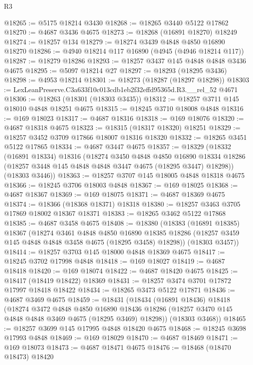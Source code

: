\begin{lexlean}{R3}
\begin{coremodule}
@18265 := @5175 @18214 @3430
@18268 := @18265 @3440 @5122 @17862
@18270 := @4687 @3436 @4675
@18273 := @18268 (@16891 @18270) @18249
@18274 := @18257 @134
@18279 := @18274 @3439 @4848 @4850 @16890 @18270
@18286 := @4940 @18214 @117 @16890 (@4945 (@4946 @18214 @117))
@18287 := @18279 @18286
@18293 := @18257 @3437 @145 @4848 @4848 @3436 @4675
@18295 := @5097 @18214 @27
@18297 := @18293 (@18295 @3436)
@18298 := @4953 @18214
@18301 := @18273 (@18287 (@18297 @18298))
@18303 := LexLeanPreserve.C3a633f10c013cdb1eb2f32effd95365d.R3.__rel_52 @4671
@18306 := @18263 (@18301 (@18303 @3435))
@18312 := @18257 @3711 @145 @18010 @4848 @18251 @4675
@18315 := @18245 @3710 @18008 @4848
@18316 := @169 @18023
@18317 := @4687 @18316
@18318 := @169 @18076
@18320 := @4687 @18318 @4675
@18323 := @18315 (@18317 @18320) @18251
@18329 := @18257 @3452 @3709 @17866 @18007 @18316 @18320
@18332 := @18265 @3451 @5122 @17865
@18334 := @4687 @3447 @4675
@18357 := @18329
    (@18332
      (@16891 @18334)
      @18316
      (@18274
        @3450
        @4848
        @4850
        @16890
        @18334
        @18286
        (@18257 @3448 @145 @4848 @4848 @3447 @4675 (@18295 @3447) @18298))
      (@18303 @3446))
@18363 := @18257 @3707 @145 @18005 @4848 @18318 @4675
@18366 := @18245 @3706 @18003 @4848
@18367 := @169 @18025
@18368 := @4687 @18367
@18369 := @169 @18075
@18371 := @4687 @18369 @4675
@18374 := @18366 (@18368 @18371) @18318
@18380 := @18257 @3463 @3705 @17869 @18002 @18367 @18371
@18383 := @18265 @3462 @5122 @17868
@18385 := @4687 @3458 @4675
@18408 := @18380
    (@18383
      (@16891 @18385)
      @18367
      (@18274
        @3461
        @4848
        @4850
        @16890
        @18385
        @18286
        (@18257 @3459 @145 @4848 @4848 @3458 @4675 (@18295 @3458) @18298))
      (@18303 @3457))
@18414 := @18257 @3703 @145 @18000 @4848 @18369 @4675
@18417 := @18245 @3702 @17998 @4848
@18418 := @169 @18027
@18419 := @4687 @18418
@18420 := @169 @18074
@18422 := @4687 @18420 @4675
@18425 := @18417 (@18419 @18422) @18369
@18431 := @18257 @3474 @3701 @17872 @17997 @18418 @18422
@18434 := @18265 @3473 @5122 @17871
@18436 := @4687 @3469 @4675
@18459 := @18431
    (@18434
      (@16891 @18436)
      @18418
      (@18274
        @3472
        @4848
        @4850
        @16890
        @18436
        @18286
        (@18257 @3470 @145 @4848 @4848 @3469 @4675 (@18295 @3469) @18298))
      (@18303 @3468))
@18465 := @18257 @3699 @145 @17995 @4848 @18420 @4675
@18468 := @18245 @3698 @17993 @4848
@18469 := @169 @18029
@18470 := @4687 @18469
@18471 := @169 @18073
@18473 := @4687 @18471 @4675
@18476 := @18468 (@18470 @18473) @18420

\end{coremodule}
\end{lexlean}

